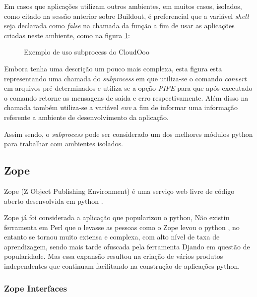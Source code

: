 Em casos que aplicações utilizam outros ambientes, em muitos casos, isolados, como citado na sessão anterior sobre Buildout, é preferencial que a variável \textit{shell} seja declarada como \textit{false} na chamada da função a fim de usar as aplicações criadas neste ambiente, como na figura \ref{subprocess_convert}:

\begin{figure}[ht]
    \centering
    \caption{Exemplo de uso subprocess do CloudOoo}
    \label{subprocess_convert}
\end{figure}

Embora tenha uma descrição um pouco mais complexa, esta figura esta representando uma chamada do \textit{subprocess} em que utiliza-se o comando \textit{convert} em arquivos pré determinados e utiliza-se a opção \textit{PIPE} para que após executado o comando retorne as mensagens de saída e erro respectivamente. Além disso na chamada também utiliza-se a variável \textit{env} a fim de informar uma informação referente a ambiente de desenvolvimento da aplicação.

Assim sendo, o \textit{subprocess} pode ser considerado um dos melhores módulos python para trabalhar com ambientes isolados.

\subsection{Zope}

Zope (Z Object Publishing Environment) é uma serviço web livre de código aberto desenvolvida em python \cite{ZOPE2}.

Zope já foi considerada a aplicação que popularizou o python, Não existiu ferramenta em Perl que o levasse as pessoas como o Zope levou o python \cite{UDELL}, no entanto se tornou muito extensa e complexa, com alto nível de taxa de aprendizagem, sendo mais tarde ofuscada pela ferramenta Djando em questão de popularidade. Mas essa expansão resultou na criação de vários produtos independentes que continuam facilitando na construção de aplicações python.

\subsubsection{Zope Interfaces}

